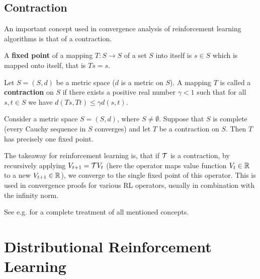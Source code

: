 \subsection{Contraction}\label{sec:contraction}
An important concept used in convergence analysis of reinforcement learning algorithms is that of a contraction.
\begin{definition}
A \textbf{fixed point} of a mapping $T: S\to S$ of a set $S$ into itself is $s\in S$ which is mapped onto itself, that is $Ts=s$.

Let $S=(S,d)$ be a metric space ($d$ is a metric on $S$). A mapping $T$ is called a \textbf{contraction} on $S$ if there exists a positive real number $\gamma < 1$ such that for all $s, t \in S$ we have $d(Ts, Tt) \le \gamma d(s,t)$.
\end{definition}

\begin{theorem}
Consider a metric space $S=(S,d)$, where $S \neq \emptyset$. Suppose that $S$ is complete (every Cauchy sequence in $S$ converges) and let $T$ be a contraction on $S$. Then $T$ has precisely one fixed point.
\end{theorem}


The takeaway for reinforcement learning is, that if $\mathcal{T}$ is a contraction, by recursively applying $V_{t+1}=\mathcal{T} V_t$ (here the operator maps value function $V_t \in \mathbb{R}$ to a new $V_{t+1} \in \mathbb{R}$), we converge to the single fixed point of this operator. This is used in convergence proofs for various RL operators, usually in combination with the infinity norm.

See e.g. \citet{kreyszig1989introductory} for a complete treatment of all mentioned concepts.





\section{Distributional Reinforcement Learning}\label{sec:prelim:distrl}

